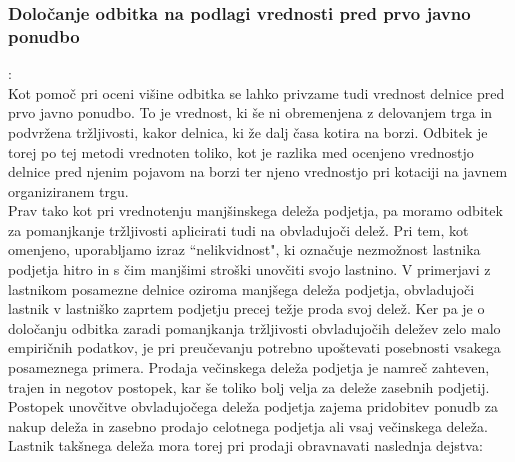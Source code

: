 \documentclass[12pt,a4paper]{amsart}
\theoremstyle{definition} %
\theoremstyle{plain} %
\begin{document}
\subsubsection{Določanje odbitka na podlagi vrednosti pred prvo javno ponudbo}:\\

Kot pomoč pri oceni višine odbitka se lahko privzame tudi vrednost delnice pred prvo javno ponudbo. To je vrednost, ki še ni obremenjena z delovanjem trga in podvržena tržljivosti, kakor delnica, ki že dalj časa kotira na borzi. Odbitek je torej po tej metodi vrednoten toliko, kot je razlika med ocenjeno vrednostjo delnice pred njenim pojavom na borzi ter njeno vrednostjo pri kotaciji na javnem organiziranem trgu.  \\


Prav tako kot pri vrednotenju manjšinskega deleža podjetja, pa moramo odbitek za pomanjkanje tržljivosti aplicirati tudi na obvladujoči delež. Pri tem, kot omenjeno, uporabljamo izraz ``nelikvidnost", ki označuje nezmožnost lastnika podjetja hitro in s čim manjšimi stroški unovčiti svojo lastnino. V primerjavi z lastnikom posamezne delnice oziroma manjšega deleža podjetja, obvladujoči lastnik v lastniško zaprtem podjetju precej težje proda svoj delež. Ker pa je o določanju odbitka zaradi pomanjkanja tržljivosti obvladujočih deležev zelo malo empiričnih podatkov, je pri preučevanju potrebno upoštevati posebnosti vsakega posameznega primera.%
Prodaja večinskega deleža podjetja je namreč zahteven, trajen in negotov postopek, kar še toliko bolj velja za deleže zasebnih podjetij. Postopek unovčitve obvladujočega deleža podjetja zajema pridobitev ponudb za nakup deleža in zasebno prodajo celotnega podjetja ali vsaj večinskega deleža. Lastnik takšnega deleža mora torej pri prodaji obravnavati naslednja dejstva:
\end{document}
